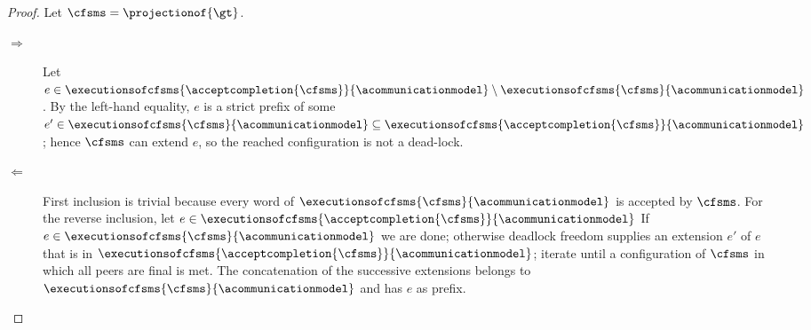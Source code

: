 \begin{proof}
    Let $\cfsms=\projectionof{\gt}$.
    \begin{description}
        \item[$\Rightarrow$]
            Let $e\in\executionsofcfsms{\acceptcompletion{\cfsms}}{\acommunicationmodel}\setminus \executionsofcfsms{\cfsms}{\acommunicationmodel}$.
            By the left-hand equality, $e$ is a strict prefix of some
            $e' \in \executionsofcfsms{\cfsms}{\acommunicationmodel} \subseteq \executionsofcfsms{\acceptcompletion{\cfsms}}{\acommunicationmodel}$;
            hence $\cfsms$ can extend $e$, so the reached configuration is not a dead-lock.
        \item[$\Leftarrow$]
            First inclusion is trivial because every word of $\executionsofcfsms{\cfsms}{\acommunicationmodel}$ is accepted by $\cfsms$.
            For the reverse inclusion, let $e\in\executionsofcfsms{\acceptcompletion{\cfsms}}{\acommunicationmodel}$
            If $e\in \executionsofcfsms{\cfsms}{\acommunicationmodel}$ we are done; otherwise deadlock freedom supplies an extension $e'$ of $e$ that is in
             $\executionsofcfsms{\acceptcompletion{\cfsms}}{\acommunicationmodel}$; iterate until a configuration of $\cfsms$ in which all peers are final is met. 
            The concatenation of the successive extensions belongs to $\executionsofcfsms{\cfsms}{\acommunicationmodel}$ and has $e$ as prefix.
    \end{description}
\end{proof}